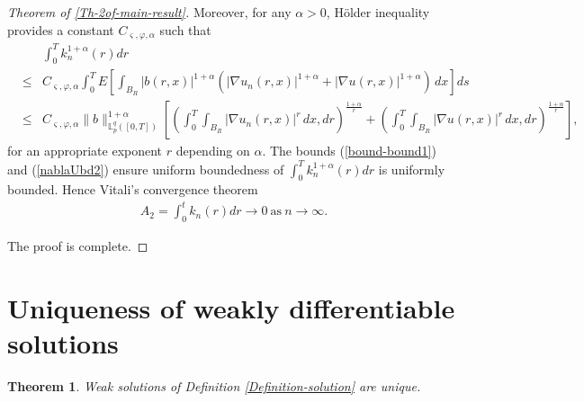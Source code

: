 \documentclass[12pt,oneside, reqno]{amsart}
\newcommand{\ce}{\begin{eqnarray*}}
\newcommand{\de}{\end{eqnarray*}}
\newtheorem{theorem}{Theorem}[section]
\def\mL{{\mathbb L}}
\def\leq{\leqslant}
\numberwithin{equation}{section}
\begin{document}
\begin{proof}[Theorem of \ref{Th-2of-main-result}]
Moreover,  for any $\alpha>0$,  H\"{o}lder inequality provides a constant $C_{\varsigma,\varphi,\alpha}$ such that 
\ce 
&&\int_0^Tk_n^{1+\alpha}(r)dr\\
&\leq&  C_{\varsigma,\varphi,\alpha}\int_0^T E\left[\int_{B_R} |b(r,x)|^{1+\alpha}(|\nabla u_n(r,x)|^{1+\alpha}+|\nabla u(r,x)|^{1+\alpha})\,dx\right] ds\\
&\leq&  C_{\varsigma,\varphi,\alpha}\|b\|_{\mL_p^q([0,T])}^{1+\alpha}\left[\left(\int_0^T\int_{B_R}|\nabla u_n(r,x)|^r\,dx,dr\right)^{\frac{1+\alpha}{r}}+\left(\int_0^T\int_{B_R}|\nabla u(r,x)|^r\,dx,dr\right)^{\frac{1+\alpha}{r}}\right],
\de 
for an appropriate exponent  $r$ depending on $\alpha$. The bounds (\ref{bound-bound1})  and (\ref{nablaUbd2}) ensure uniform boundedness of $\int_0^Tk_n^{1+\alpha}(r)dr$ is uniformly bounded.  Hence Vitali's  convergence theorem 
\ce 
A_2=\int_0^tk_n(r)dr\to 0~\mbox{as}~n\to\infty. 
\de  

The proof is complete.
\end{proof}


\section{Uniqueness of weakly differentiable solutions}
\begin{theorem}\label{unique of solution1}
	Weak solutions of Definition \ref{Definition-solution} are unique.
\end{theorem}
\end{document}
